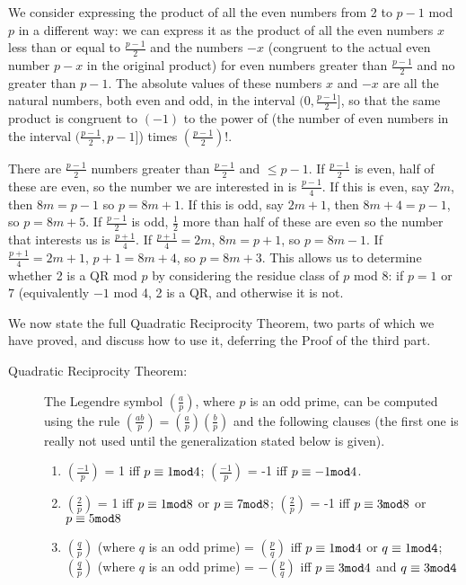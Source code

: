 \documentclass[12pt]{article}
\begin{document}
\begin{description}
 We consider expressing the product of all the even numbers from 2 to $p-1$ mod $p$ in a different way:  we can express it as the product of all the even numbers $x$
less than or equal to $\frac{p-1}2$ and the numbers $-x$ (congruent to the actual even number $p-x$ in the original product) for even numbers greater than $\frac{p-1}2$ and no greater than $p-1$.   The absolute values of these numbers $x$ and $-x$ are all the natural numbers, both even and odd, in the interval $(0,\frac{p-1}2]$,  so that the same product is congruent to $(-1)$ to the power of (the number of even numbers in the interval $(\frac{p-1}2,p-1]$) times $(\frac{p-1}2)!$.  

There are $\frac{p-1}2$ numbers  greater than $\frac{p-1}2$ and $\leq p-1$.  If $\frac{p-1}2$ is even, half of these are even, so the number we are interested in is $\frac{p-1}4$.  If this is even, say $2m$, then $8m=p-1$ so
$p=8m+1$.   If this is odd, say $2m+1$, then $8m+4=p-1$, so $p=8m+5$.  If $\frac{p-1}2$ is odd, $\frac 12$ more than half of these are even so the number that interests us is $\frac{p+1}4$.  If $\frac{p+1}4=2m$,
$8m=p+1$, so $p=8m-1$.   If $\frac{p+1}4=2m+1$, $p+1=8m+4$, so $p=8m+3$.  This allows us to determine whether 2 is a QR mod $p$ by considering the residue class of $p$ mod 8:  if $p=1$ or $7 $ (equivalently $ -1$ mod 4, 2 is a QR,
and otherwise it is not.

 \end{description}

We now state the full Quadratic Reciprocity Theorem, two parts of which we have proved, and discuss how to use it, deferring the Proof of the third part.

\begin{description}

\item[Quadratic Reciprocity Theorem:]   The Legendre symbol $\left(\frac ap\right)$, where $p$ is an odd prime,  can be computed using the rule $\left(\frac{ab}p\right) = \left(\frac ap\right)\left(\frac bp\right)$ and the following clauses
(the first one is really not used until the generalization stated below is given). 

\begin{enumerate}

\item  $\left(\frac{-1}p\right)$ = 1 iff $p \equiv1{\tt mod}4$; $\left(\frac{-1}p\right)$ = -1 iff $p \equiv-1{\tt mod}4$.

\item   $\left(\frac{2}p\right)$ = 1 iff $p \equiv 1{\tt mod}8$ or  $p \equiv 7{\tt mod}8$;   $\left(\frac{2}p\right)$ = -1 iff $p \equiv 3{\tt mod}8$ or  $p \equiv 5{\tt mod}8$

\item  $\left(\frac qp\right)$ (where $q$ is an odd prime) = $\left(\frac pq\right)$ iff $p \equiv 1{\tt mod}4$ or $q \equiv 1{\tt mod 4}$;    $\left(\frac qp\right)$ (where $q$ is an odd prime) = $-\left(\frac pq\right)$ iff $p \equiv 3{\tt mod}4$ and $q \equiv 3{\tt mod 4}$

\end{enumerate}

\end{description}
\end{document}
